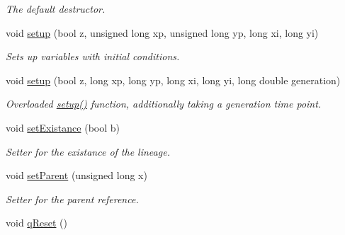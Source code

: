 \begin{DoxyCompactItemize}
\begin{DoxyCompactList}\small\item\em The default destructor. \end{DoxyCompactList}\item 
void \hyperlink{class_treenode_a3664bad0e23571689662ca26aad97f62}{setup} (bool z, unsigned long xp, unsigned long yp, long xi, long yi)
\begin{DoxyCompactList}\small\item\em Sets up variables with initial conditions. \end{DoxyCompactList}\item 
void \hyperlink{class_treenode_ab915e141f3dfca9f32e9144dbe2d9915}{setup} (bool z, long xp, long yp, long xi, long yi, long double generation)
\begin{DoxyCompactList}\small\item\em Overloaded \hyperlink{class_treenode_a3664bad0e23571689662ca26aad97f62}{setup()} function, additionally taking a generation time point. \end{DoxyCompactList}\item 
void \hyperlink{class_treenode_a09f4c23f8182919fbe5ba4441c6f9789}{set\+Existance} (bool b)
\begin{DoxyCompactList}\small\item\em Setter for the existance of the lineage. \end{DoxyCompactList}\item 
void \hyperlink{class_treenode_a4aceb22d86000b58f10039b7fd396aa6}{set\+Parent} (unsigned long x)
\begin{DoxyCompactList}\small\item\em Setter for the parent reference. \end{DoxyCompactList}\item 
void \hyperlink{class_treenode_a9f67cecf8724424486f08b31080a3f21}{q\+Reset} ()\hypertarget{class_treenode_a9f67cecf8724424486f08b31080a3f21}{}\label{class_treenode_a9f67cecf8724424486f08b31080a3f21}


\end{DoxyCompactItemize}
